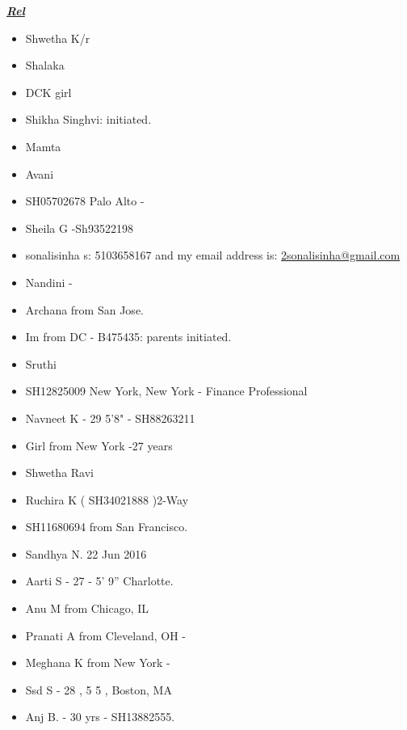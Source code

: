   
\underline{\bf \it Rel}
    \begin{itemize} 
      \small \item \small Shwetha K/r
    \item \small Shalaka 
    \item \tiny DCK girl 
    \item \tiny  Shikha Singhvi: initiated.  
    \item \small Mamta
    \item \small Avani 
    \item \small SH05702678 Palo Alto - 
    \item \small Sheila G -Sh93522198  
    \item \small sonalisinha  s: 5103658167 and my email address is: \url{2sonalisinha@gmail.com}
    \item \small Nandini  - 
    \item \small Archana from San Jose. 
    \item \small Im from DC  - B475435: parents initiated. 
    \item \small Sruthi 
    \item \small SH12825009 New York, New York - Finance Professional 
    \item \small Navneet K  - 29 5'8" - SH88263211 
    \item \small Girl from New York  -27 years
    \item \small Shwetha Ravi 
    \item \small Ruchira K ( SH34021888 )2-Way           
    \item \small SH11680694 from San Francisco. 
    \item \small Sandhya N. 22 Jun 2016 
    \item \small Aarti S - 27 - 5' 9'' Charlotte.  
    \item \small Anu M from Chicago, IL 
    \item \small Pranati A from Cleveland, OH - 
    \item \small Meghana K from New York - 
    \item \small Ssd S - 28 , 5 5 , Boston, MA 
    \item \small Anj B. - 30 yrs - SH13882555.
    \end{itemize}
